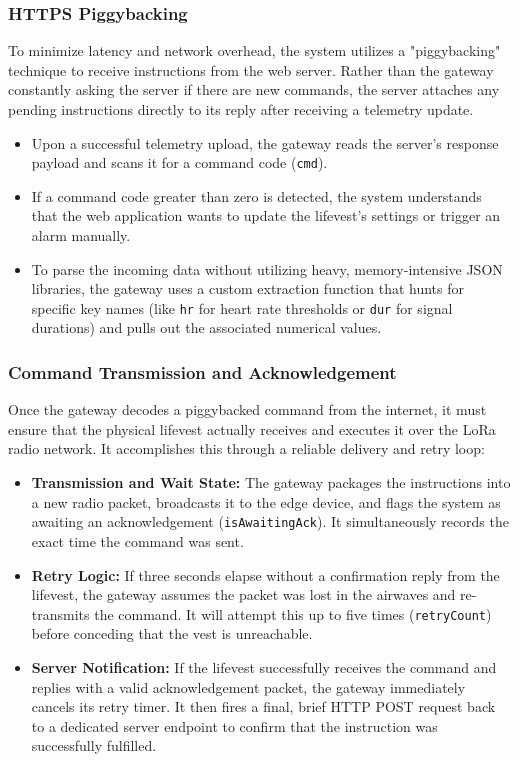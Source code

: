\documentclass{article}
\begin{document}
\subsubsection{HTTPS Piggybacking}
To minimize latency and network overhead, the system utilizes a "piggybacking" technique to receive instructions from the web server. Rather than the gateway constantly asking the server if there are new commands, the server attaches any pending instructions directly to its reply after receiving a telemetry update.
\begin{itemize}
\item Upon a successful telemetry upload, the gateway reads the server's response payload and scans it for a command code (\verb|cmd|).
\item If a command code greater than zero is detected, the system understands that the web application wants to update the lifevest's settings or trigger an alarm manually.
\item To parse the incoming data without utilizing heavy, memory-intensive JSON libraries, the gateway uses a custom extraction function that hunts for specific key names (like \verb|hr| for heart rate thresholds or \verb|dur| for signal durations) and pulls out the associated numerical values.
\end{itemize}

\subsubsection{Command Transmission and Acknowledgement}
Once the gateway decodes a piggybacked command from the internet, it must ensure that the physical lifevest actually receives and executes it over the LoRa radio network. It accomplishes this through a reliable delivery and retry loop:
\begin{itemize}
\item \textbf{Transmission and Wait State:} The gateway packages the instructions into a new radio packet, broadcasts it to the edge device, and flags the system as awaiting an acknowledgement (\verb|isAwaitingAck|). It simultaneously records the exact time the command was sent.
\item \textbf{Retry Logic:} If three seconds elapse without a confirmation reply from the lifevest, the gateway assumes the packet was lost in the airwaves and re-transmits the command. It will attempt this up to five times (\verb|retryCount|) before conceding that the vest is unreachable.
\item \textbf{Server Notification:} If the lifevest successfully receives the command and replies with a valid acknowledgement packet, the gateway immediately cancels its retry timer. It then fires a final, brief HTTP POST request back to a dedicated server endpoint to confirm that the instruction was successfully fulfilled.
\end{itemize}
\end{document}
